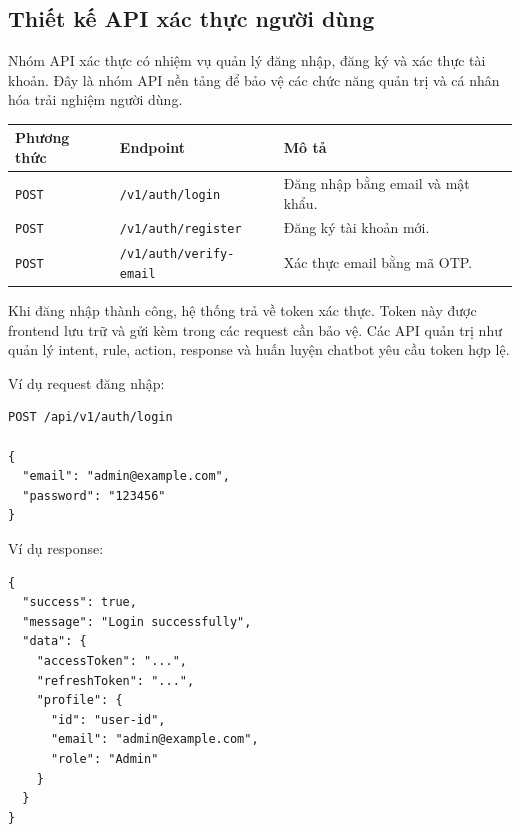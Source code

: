 \subsection{Thiết kế API xác thực người dùng}

Nhóm API xác thực có nhiệm vụ quản lý đăng nhập, đăng ký và xác thực tài khoản. Đây là nhóm API nền tảng để bảo vệ các chức năng quản trị và cá nhân hóa trải nghiệm người dùng.

\begin{longtable}{|p{3cm}|p{5cm}|p{7cm}|}
\hline
\textbf{Phương thức} & \textbf{Endpoint} & \textbf{Mô tả} \\
\hline
\texttt{POST} & \texttt{/v1/auth/login} & Đăng nhập bằng email và mật khẩu. \\
\hline
\texttt{POST} & \texttt{/v1/auth/register} & Đăng ký tài khoản mới. \\
\hline
\texttt{POST} & \texttt{/v1/auth/verify-email} & Xác thực email bằng mã OTP. \\
\hline
\end{longtable}

Khi đăng nhập thành công, hệ thống trả về token xác thực. Token này được frontend lưu trữ và gửi kèm trong các request cần bảo vệ. Các API quản trị như quản lý intent, rule, action, response và huấn luyện chatbot yêu cầu token hợp lệ.

Ví dụ request đăng nhập:

\begin{verbatim}
POST /api/v1/auth/login

{
  "email": "admin@example.com",
  "password": "123456"
}
\end{verbatim}

Ví dụ response:

\begin{verbatim}
{
  "success": true,
  "message": "Login successfully",
  "data": {
    "accessToken": "...",
    "refreshToken": "...",
    "profile": {
      "id": "user-id",
      "email": "admin@example.com",
      "role": "Admin"
    }
  }
}
\end{verbatim}
